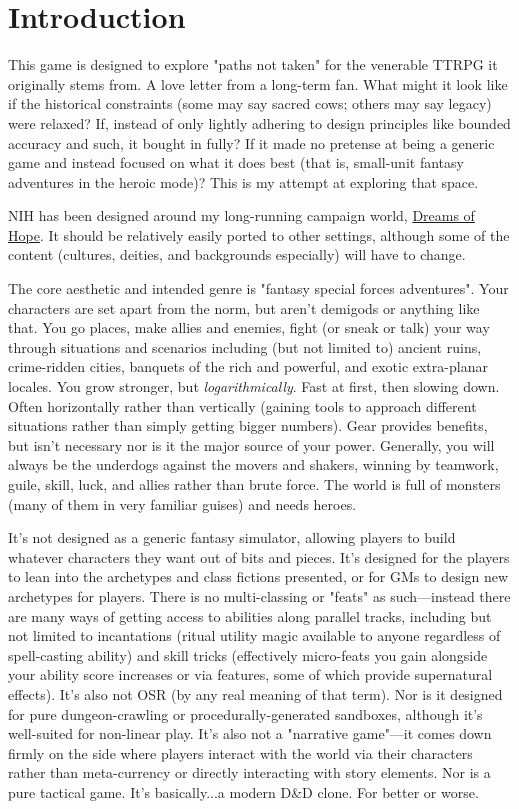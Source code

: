 \chapter{Introduction}
This game is designed to explore "paths not taken" for the venerable TTRPG it originally stems from. A love letter from a long-term fan. What might it look like if the historical constraints (some may say sacred cows; others may say legacy) were relaxed? If, instead of only lightly adhering to design principles like bounded accuracy and such, it bought in fully? If it made no pretense at being a generic game and instead focused on what it does best (that is, small-unit fantasy adventures in the heroic mode)? This is my attempt at exploring that space.

NIH has been designed around my long-running campaign world, \href{https://wiki.admiralbenbo.com}{Dreams of Hope}. It should be relatively easily ported to other settings, although some of the content (cultures, deities, and backgrounds especially) will have to change.

The core aesthetic and intended genre is "fantasy special forces adventures". Your characters are set apart from the norm, but aren't demigods or anything like that. You go places, make allies and enemies, fight (or sneak or talk) your way through situations and scenarios including (but not limited to) ancient ruins, crime-ridden cities, banquets of the rich and powerful, and exotic extra-planar locales. You grow stronger, but \textit{logarithmically}. Fast at first, then slowing down. Often horizontally rather than vertically (gaining tools to approach different situations rather than simply getting bigger numbers). Gear provides benefits, but isn't necessary nor is it the major source of your power. Generally, you will always be the underdogs against the movers and shakers, winning by teamwork, guile, skill, luck, and allies rather than brute force. The world is full of monsters (many of them in very familiar guises) and needs heroes.

It's not designed as a generic fantasy simulator, allowing players to build whatever characters they want out of bits and pieces. It's designed for the players to lean into the archetypes and class fictions presented, or for GMs to design new archetypes for players. There is no multi-classing or "feats" as such---instead there are many ways of getting access to abilities along parallel tracks, including but not limited to incantations (ritual utility magic available to anyone regardless of spell-casting ability) and skill tricks (effectively micro-feats you gain alongside your ability score increases or via features, some of which provide supernatural effects). It's also not OSR (by any real meaning of that term). Nor is it designed for pure dungeon-crawling or procedurally-generated sandboxes, although it's well-suited for non-linear play. It's also not a "narrative game"---it comes down firmly on the side where players interact with the world via their characters rather than meta-currency or directly interacting with story elements. Nor is a pure tactical game. It's basically...a modern D\&D clone. For better or worse.

